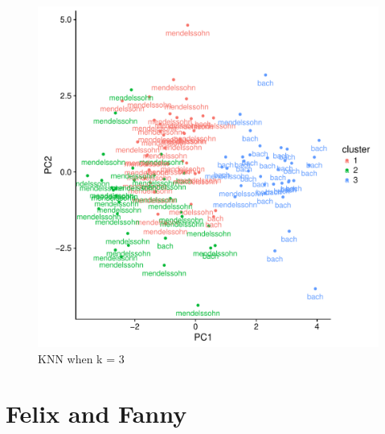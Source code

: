 \documentclass[12pt,twoside]{reedthesis}
\theoremstyle{definition}
\theoremstyle{definition}
\theoremstyle{definition}
\theoremstyle{remark}
\begin{document}
\begin{figure}[H]
\centering
\includegraphics[scale = .5]{images/kmeans_3_b.pdf}
\caption{KNN when k = 3}
\label{subd}
\end{figure}
\section{Felix and Fanny}\label{felix-and-fanny}
\end{document}
